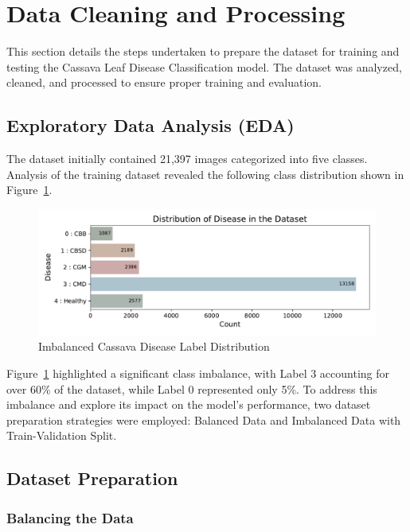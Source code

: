 \section{Data Cleaning and Processing}
This section details the steps undertaken to prepare the dataset for training and testing the Cassava Leaf Disease Classification model. The dataset was analyzed, cleaned, and processed to ensure proper training and evaluation.

\subsection{\textbf{Exploratory Data Analysis (EDA)}}
The dataset initially contained 21,397 images categorized into five classes. Analysis of the training dataset revealed the following class distribution shown in Figure~\ref{fig:ImbalancedData}.

\begin{figure}[t]
    \centering
    \includegraphics[width=1\linewidth]{graphs/overview/Distribution of Disease in the Dataset.pdf}
    \caption{Imbalanced Cassava Disease Label Distribution}
    \label{fig:ImbalancedData}
\end{figure}

Figure~\ref{fig:ImbalancedData} highlighted a significant class imbalance, with Label 3 accounting for over 60\% of the dataset, while Label 0 represented only 5\%. To address this imbalance and explore its impact on the model’s performance, two dataset preparation strategies were employed: Balanced Data and Imbalanced Data with Train-Validation Split.

\subsection{\textbf{Dataset Preparation }}
\subsubsection{Balancing the Data}

